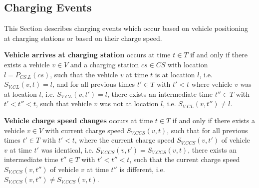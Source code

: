 \documentclass[graybox]{svmult}
\begin{document}
\subsection{Charging Events}
This Section describes charging events which occur based on vehicle positioning at charging stations or based on their charge speed.

\vspace{4mm}

\label{sec:charging-events}
\noindent
\textbf{Vehicle arrives at charging station}
occurs at time $t \in T$ if and only if there exists a vehicle $v \in V$ and a charging station $cs \in CS$ with location $l = P_{CS.L}(cs)$, such that the vehicle $v$ at time $t$ is at location $l$, i.e. $S_{V.CL}(v, t) = l$, and for all previous times $t' \in T$ with $t' < t$ where vehicle $v$ was at location $l$, i.e. $S_{V.CL}(v, t') = l$, there exists an intermediate time $t'' \in T$ with $t' < t'' < t$, such that vehicle $v$ was not at location $l$, i.e. $S_{V.CL}(v, t'') \neq l$.


\vspace{4mm}
\noindent
\textbf{Vehicle charge speed changes}
occurs at time $t \in T$ if and only if there exists a vehicle $v \in V$ with current charge speed $S_{V.CCS}(v, t)$, such that for all previous times $t' \in T$ with $t' < t$, where the current charge speed $S_{V.CCS}(v,t')$ of vehicle $v$ at time $t'$ was identical, i.e. $S_{V.CCS}(v,t') = S_{V.CCS}(v,t)$, there exists an intermediate time $t'' \in T$ with $t' < t'' < t$, such that the current charge speed $S_{V.CCS}(v,t'')$ of vehicle $v$ at time $t''$ is different, i.e. $S_{V.CCS}(v,t'') \neq S_{V.CCS}(v,t)$.

\vspace{-2mm}
\end{document}
